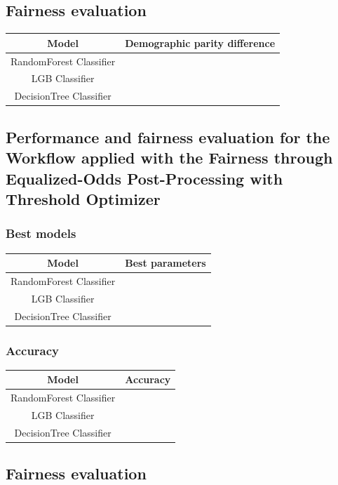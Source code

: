 \documentclass[12pt,a4paper,openright,twoside]{book}
\begin{document}
\subsection{Fairness evaluation}

\begin{tabular}{|c|c|}
    \hline
    \textbf{Model} & \textbf{Demographic parity difference} \\
    \hline
    RandomForest Classifier & \\
    \hline
    LGB Classifier & \\
    \hline
    DecisionTree Classifier & \\
    \hline
\end{tabular}

\subsection{Performance and fairness evaluation for the Workflow applied with the Fairness through Equalized-Odds Post-Processing with Threshold Optimizer}

\subsubsection{Best models}

\begin{tabular}{|c|c|}
    \hline
    \textbf{Model} & \textbf{Best parameters} \\
    \hline
    RandomForest Classifier  &  \\
    \hline
    LGB Classifier & \\
    \hline
    DecisionTree Classifier & \\
    \hline
\end{tabular}

\subsubsection{Accuracy}

\begin{tabular}{|c|c|}
    \hline
    \textbf{Model} & \textbf{Accuracy} \\ 
    \hline
    RandomForest Classifier  &  \\
    \hline
    LGB Classifier & \\
    \hline
    DecisionTree Classifier & \\ 
    \hline
\end{tabular}

\subsection{Fairness evaluation}
\end{document}
